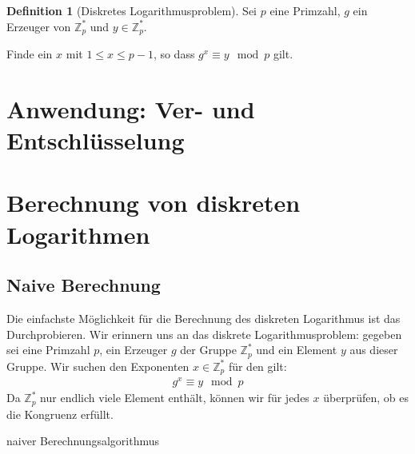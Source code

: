 \documentclass[
  a4paper,
  11pt,
]{scrartcl}
\theoremstyle{plain}
\theoremstyle{definition}
\newtheorem{definition}{Definition}
\theoremstyle{remark}
\newcommand{\Z}{\mathbb{Z}}
\renewcommand{\P}{\mathbb{P}}
\begin{document}
\begin{definition}[Diskretes Logarithmusproblem]\label{def:diskretes_logarithmusproblem}
  Sei $p$ eine Primzahl, $g$ ein Erzeuger von $\Z_p^*$ und $y \in \Z_p^*$.

  Finde ein $x$ mit $1 \leq x \leq p-1$, so dass $g^x \equiv y \mod p$ gilt.
\end{definition}

\section{Anwendung: Ver- und Entschlüsselung}
\label{sec:anwendung_ver_und_entschlusselung}

\section{Berechnung von diskreten Logarithmen}
\label{sec:berechnung_von_diskreten_logarithmen}

\subsection{Naive Berechnung}
\label{sub:naive_berechnung}

Die einfachste Möglichkeit für die Berechnung des diskreten Logarithmus ist das
Durchprobieren. Wir erinnern uns an das  diskrete
Logarithmusproblem: gegeben sei eine Primzahl $p$, ein
Erzeuger $g$ der Gruppe $\Z_p^*$ und ein Element $y$ aus dieser Gruppe. Wir
suchen den Exponenten $x \in \Z_p^*$ für den gilt:
\begin{align*}
  g^x \equiv y \mod p
\end{align*}
Da $\Z_p^*$ nur endlich viele Element enthält, können wir für jedes $x$
überprüfen, ob es die Kongruenz erfüllt.

\begin{algorithm}
  \caption{naiver Berechnungsalgorithmus}
  \begin{algorithmic}
    \REQUIRE{$p \in \P, \left\langle g \right\rangle \in \Z_p^*, y \in \Z_p^*$}
      \ELSE{}
      \ENDIF{}
    \ENDFOR{}
  \end{algorithmic}
\end{algorithm}

\end{document}
